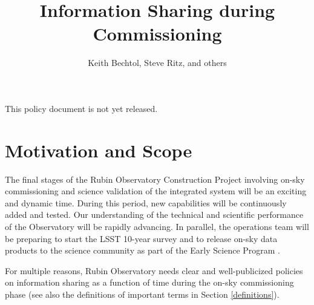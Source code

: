\documentclass[SE,authoryear,toc,lsstdraft]{lsstdoc}
\title{Information Sharing during Commissioning}
\author{
Keith Bechtol, Steve Ritz, and others
}
\date{\vcsDate}
\begin{document}
\maketitle


\begin{warning}
  This policy document is not yet released.
\end{warning}

\section{Motivation and Scope}

The final stages of the Rubin Observatory Construction Project involving on-sky commissioning and science validation of the integrated system will be an exciting and dynamic time.
During this period, new capabilities will be continuously added and tested.
Our understanding of the technical and scientific performance of the Observatory will be rapidly advancing.
In parallel, the operations team will be preparing to start the LSST 10-year survey and to release on-sky data products to the science community as part of the Early Science Program .

For multiple reasons, Rubin Observatory needs clear and well-publicized policies on information sharing as a function of time during the on-sky commissioning phase (see also the definitions of important terms in Section \ref{definitions}).
\end{document}
